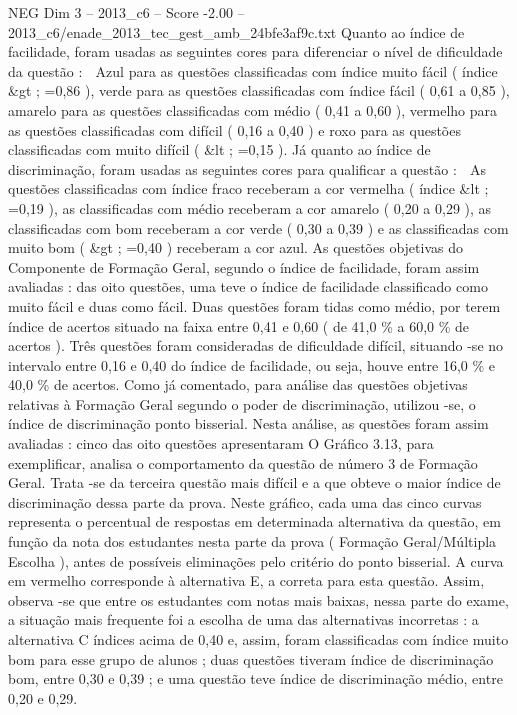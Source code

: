 \begin{textsample}{NEG Dim 3 – 2013\_c6 – Score -2.00 – 2013\_c6/enade\_2013\_tec\_gest\_amb\_24bfe3af9c.txt}
Quanto ao índice de facilidade, foram usadas as seguintes cores para diferenciar o nível de dificuldade da questão :  Azul para as questões classificadas com índice muito fácil ( índice \&gt ; =0,86 ), verde para as questões classificadas com índice fácil ( 0,61 a 0,85 ), amarelo para as questões classificadas com médio ( 0,41 a 0,60 ), vermelho para as questões classificadas com difícil ( 0,16 a 0,40 ) e roxo para as questões classificadas com muito difícil ( \&lt ; =0,15 ).
Já quanto ao índice de discriminação, foram usadas as seguintes cores para qualificar a questão :  As questões classificadas com índice fraco receberam a cor vermelha ( índice \&lt ; =0,19 ), as classificadas com médio receberam a cor amarelo ( 0,20 a 0,29 ), as classificadas com bom receberam a cor verde ( 0,30 a 0,39 ) e as classificadas com muito bom ( \&gt ; =0,40 ) receberam a cor azul.
As questões objetivas do Componente de Formação Geral, segundo o índice de facilidade, foram assim avaliadas : das oito questões, uma teve o índice de facilidade classificado como muito fácil e duas como fácil.
Duas questões foram tidas como médio, por terem índice de acertos situado na faixa entre 0,41 e 0,60 ( de 41,0 \% a 60,0 \% de acertos ).
Três questões foram consideradas de dificuldade difícil, situando -se no intervalo entre 0,16 e 0,40 do índice de facilidade, ou seja, houve entre 16,0 \% e 40,0 \% de acertos.
Como já comentado, para análise das questões objetivas relativas à Formação Geral segundo o poder de discriminação, utilizou -se, o índice de discriminação ponto bisserial.
Nesta análise, as questões foram assim avaliadas : cinco das oito questões apresentaram O Gráfico 3.13, para exemplificar, analisa o comportamento da questão de número 3 de Formação Geral.
Trata -se da terceira questão mais difícil e a que obteve o maior índice de discriminação dessa parte da prova.
Neste gráfico, cada uma das cinco curvas representa o percentual de respostas em determinada alternativa da questão, em função da nota dos estudantes nesta parte da prova ( Formação Geral/Múltipla Escolha ), antes de possíveis eliminações pelo critério do ponto bisserial.
A curva em vermelho corresponde à alternativa E, a correta para esta questão.
Assim, observa -se que entre os estudantes com notas mais baixas, nessa parte do exame, a situação mais frequente foi a escolha de uma das alternativas incorretas : a alternativa C índices acima de 0,40 e, assim, foram classificadas com índice muito bom para esse grupo de alunos ; duas questões tiveram índice de discriminação bom, entre 0,30 e 0,39 ; e uma questão teve índice de discriminação médio, entre 0,20 e 0,29.

\end{textsample}

